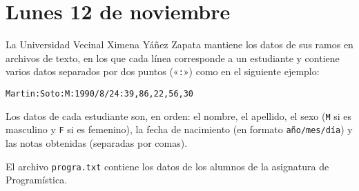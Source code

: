 \documentclass[12pt,spanish]{article}
\begin{document}
  \thispagestyle{empty}
  \section*{Lunes 12 de noviembre}

  La Universidad Vecinal Ximena Yáñez Zapata
  mantiene los datos de sus ramos en archivos de texto,
  en los que cada línea corres\-ponde a un estudiante
  y contiene varios datos separados por dos puntos («\verb+:+»)
  como en el siguiente ejemplo:
  \begin{verbatim}Martin:Soto:M:1990/8/24:39,86,22,56,30\end{verbatim}

  Los datos de cada estudiante son, en orden:
  el nombre, el apellido,
  el sexo (\verb+M+ si es masculino y \verb+F+ si es femenino),
  la fecha de nacimiento (en formato \texttt{año/mes/día})
  y las notas obtenidas (separadas por comas).

  El archivo \texttt{progra.txt} contiene los datos
  de los alumnos de la asignatura de Programística.
\end{document}
